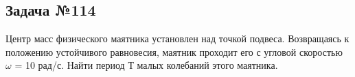 \subsection{Задача №114}

Центр масс физического маятника установлен над точкой подвеса. Возвращаясь к положению устойчивого равновесия, маятник проходит его с угловой скоростью $\omega$ = 10 рад/с. Найти период $Т$ малых колебаний этого маятника.
